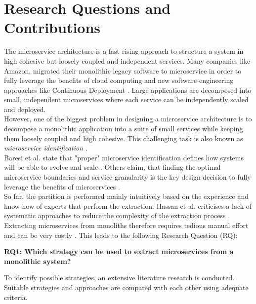 \section{Research Questions and Contributions}
\label{sec:Introduction:ResearchQuestions}
The microservice architecture is a fast rising approach to structure a system in high cohesive but loosely coupled and independent services. Many companies like Amazon, migrated their monolithic legacy software to microservice in order to fully leverage the benefits of cloud computing and new software engineering approaches like Continuous Deployment \cite{MigratingCloud}. Large applications are decomposed into small, independent microservices where each service can be independently scaled and deployed. 
\\
However, one of the biggest problem in designing a microservice architecture is to decompose a monolithic application into a suite of small services while keeping them loosely coupled and high cohesive. This challenging task is also known as \textit{microservice identification} \cite{ObjectAwareAmiri}. \\
Baresi et al. state that "proper" microservice identification defines how systems will be able to evolve and scale \cite{interfaceAnalysisBaresi}. Others claim, that finding the optimal microservice boundaries and service granularity is the key design decision to fully leverage the benefits of microservices \cite{ClassificationOfRefactoring} \cite{ArchitecturalMetaModelling}. 
\\
So far, the partition is performed mainly intuitively based on the experience and know-how of experts that perform the extraction. Hassan et al. criticises a lack of systematic approaches to reduce the complexity of the extraction process \cite{ArchitecturalMetaModelling}. Extracting microservices from monoliths therefore requires tedious manual effort and can be very costly \cite{FunctionalDecompositionHeinrich} \cite{ExtractionMazlami}. This leads to the following Research Question (RQ):

\vspace{1cm}
\par
\begingroup
\leftskip=1cm
\rightskip=1cm


\noindent
\textbf{RQ1: Which strategy can be used to extract microservices from a monolithic  
	system? }

\vspace{0.5cm}
\noindent
To identify possible strategies, an extensive literature research is conducted. Suitable strategies and approaches are compared with each other using adequate criteria.
\vspace{0.5cm}

